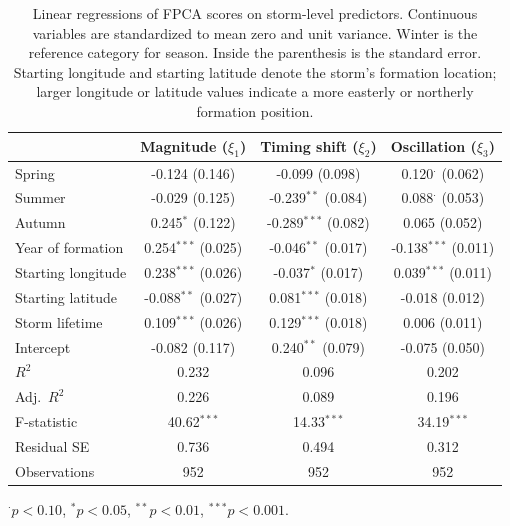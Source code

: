 \documentclass{article}
\begin{document}
\FloatBarrier
\begin{table}[!t]
\caption{Linear regressions of FPCA scores on storm-level predictors.
Continuous variables are standardized to mean zero and unit variance.
Winter is the reference category for season. Inside the parenthesis is the standard error. Starting longitude and starting latitude denote the storm’s formation location; larger longitude or latitude values indicate a more easterly or northerly formation position.}
\begin{small}
\begin{sc}
\label{tab:pc_reg}
\begin{center}
\vspace{0.15in}
\begin{threeparttable}
\begin{tabular}{lccc}
\toprule
 & Magnitude (${\xi}_1$) & Timing shift (${\xi}_2$) & Oscillation (${\xi}_3$) \\
\midrule
Spring            & -0.124 (0.146)        & -0.099 (0.098)        & 0.120$^{\cdot}$ (0.062) \\
Summer            & -0.029 (0.125)        & -0.239$^{**}$ (0.084) & 0.088$^{\cdot}$ (0.053) \\
Autumn            & 0.245$^{*}$ (0.122)   & -0.289$^{***}$ (0.082)& 0.065 (0.052) \\
Year of formation & 0.254$^{***}$ (0.025) & -0.046$^{**}$ (0.017) & -0.138$^{***}$ (0.011) \\
Starting longitude& 0.238$^{***}$ (0.026) & -0.037$^{*}$ (0.017)  & 0.039$^{***}$ (0.011) \\
Starting latitude & -0.088$^{**}$ (0.027) & 0.081$^{***}$ (0.018) & -0.018 (0.012) \\
Storm lifetime    & 0.109$^{***}$ (0.026) & 0.129$^{***}$ (0.018) & 0.006 (0.011) \\
Intercept         & -0.082 (0.117)        & 0.240$^{**}$ (0.079)  & -0.075 (0.050) \\
\midrule
$R^2$             & 0.232                 & 0.096                 & 0.202 \\
Adj.\ $R^2$       & 0.226                 & 0.089                 & 0.196 \\
F-statistic       & 40.62$^{***}$         & 14.33$^{***}$         & 34.19$^{***}$ \\
Residual SE       & 0.736                 & 0.494                 & 0.312 \\
Observations      & 952                   & 952                   & 952 \\
\bottomrule
\end{tabular}
\begin{tablenotes}
\footnotesize
\item $^{\cdot}p<0.10$, $^{*}p<0.05$, $^{**}p<0.01$, $^{***}p<0.001$.
\end{tablenotes}
\end{threeparttable}
\end{center}
\end{sc}
\end{small}
\end{table}
\end{document}
